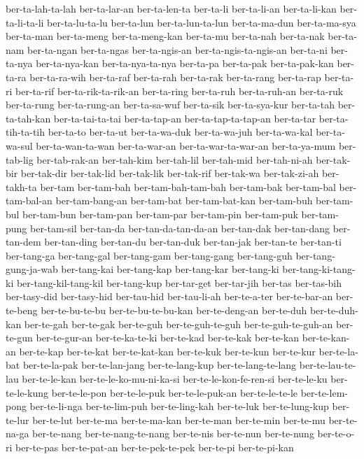 {ber-ta-lah-ta-lah ber-ta-lar-an ber-ta-len-ta ber-ta-li ber-ta-li-an
ber-ta-li-kan ber-ta-li-ta-li ber-ta-lu-ta-lu ber-ta-lun ber-ta-lun-ta-lun
ber-ta-ma-dun ber-ta-ma-sya ber-ta-man ber-ta-meng ber-ta-meng-kan
ber-ta-mu ber-ta-nah ber-ta-nak ber-ta-nam ber-ta-ngan ber-ta-ngas
ber-ta-ngis-an ber-ta-ngis-ta-ngis-an ber-ta-ni ber-ta-nya ber-ta-nya-kan
ber-ta-nya-ta-nya ber-ta-pa ber-ta-pak ber-ta-pak-kan ber-ta-ra
ber-ta-ra-wih ber-ta-raf ber-ta-rah ber-ta-rak ber-ta-rang ber-ta-rap
ber-ta-ri ber-ta-rif ber-ta-rik-ta-rik-an ber-ta-ring ber-ta-ruh
ber-ta-ruh-an ber-ta-ruk ber-ta-rung ber-ta-rung-an ber-ta-sa-wuf
ber-ta-sik ber-ta-sya-kur ber-ta-tah ber-ta-tah-kan ber-ta-tai-ta-tai
ber-ta-tap-an ber-ta-tap-ta-tap-an ber-ta-tar ber-ta-tih-ta-tih ber-ta-to
ber-ta-ut ber-ta-wa-duk ber-ta-wa-juh ber-ta-wa-kal ber-ta-wa-sul
ber-ta-wan-ta-wan ber-ta-war-an ber-ta-war-ta-war-an ber-ta-ya-mum
ber-tab-lig ber-tab-rak-an ber-tah-kim ber-tah-lil ber-tah-mid
ber-tah-ni-ah ber-tak-bir ber-tak-dir ber-tak-lid ber-tak-lik ber-tak-rif
ber-tak-wa ber-tak-zi-ah ber-takh-ta ber-tam ber-tam-bah
ber-tam-bah-tam-bah ber-tam-bak ber-tam-bal ber-tam-bal-an ber-tam-bang-an
ber-tam-bat ber-tam-bat-kan ber-tam-buh ber-tam-bul ber-tam-bun
ber-tam-pan ber-tam-par ber-tam-pin ber-tam-puk ber-tam-pung ber-tam-sil
ber-tan-da ber-tan-da-tan-da-an ber-tan-dak ber-tan-dang ber-tan-dem
ber-tan-ding ber-tan-du ber-tan-duk ber-tan-jak ber-tan-te ber-tan-ti
ber-tang-ga ber-tang-gal ber-tang-gam ber-tang-gang ber-tang-guh
ber-tang-gung-ja-wab ber-tang-kai ber-tang-kap ber-tang-kar ber-tang-ki
ber-tang-ki-tang-ki ber-tang-kil-tang-kil ber-tang-kup ber-tar-get
ber-tar-jih ber-tas ber-tas-bih ber-tasy-did ber-tasy-hid ber-tau-hid
ber-tau-li-ah ber-te-a-ter ber-te-bar-an ber-te-beng ber-te-bu-te-bu
ber-te-bu-te-bu-kan ber-te-deng-an ber-te-duh ber-te-duh-kan ber-te-gah
ber-te-gak ber-te-guh ber-te-guh-te-guh ber-te-guh-te-guh-an ber-te-gun
ber-te-gur-an ber-te-ka-te-ki ber-te-kad ber-te-kak ber-te-kan
ber-te-kan-an ber-te-kap ber-te-kat ber-te-kat-kan ber-te-kuk ber-te-kun
ber-te-kur ber-te-la-bat ber-te-la-pak ber-te-lan-jang ber-te-lang-kup
ber-te-lang-te-lang ber-te-lau-te-lau ber-te-le-kan
ber-te-le-ko-mu-ni-ka-si ber-te-le-kon-fe-ren-si ber-te-le-ku
ber-te-le-kung ber-te-le-pon ber-te-le-puk ber-te-le-puk-an
ber-te-le-te-le ber-te-lem-pong ber-te-li-nga ber-te-lim-puh
ber-te-ling-kah ber-te-luk ber-te-lung-kup ber-te-lur ber-te-lut ber-te-ma
ber-te-ma-kan ber-te-man ber-te-min ber-te-mu ber-te-na-ga ber-te-nang
ber-te-nang-te-nang ber-te-nis ber-te-nun ber-te-nung ber-te-o-ri
ber-te-pas ber-te-pat-an ber-te-pek-te-pek ber-te-pi ber-te-pi-kan
}
